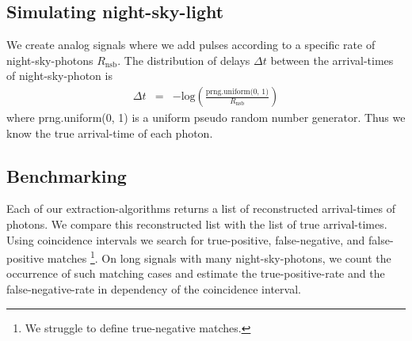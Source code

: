 \documentclass{article}%
\begin{document}
\begin{multicols}{2}
\subsection*{Simulating night-sky-light}%
%
We create analog signals where we add pulses according to a specific rate of night-sky-photons $R_\text{nsb}$.
%
The distribution of delays $\Delta t$ between the arrival-times of night-sky-photon is
%
\begin{eqnarray}
\Delta t &=& - \mathrm{log}\left( \frac{\text{prng.uniform(0, 1)}}{R_\text{nsb}}\right)
\end{eqnarray}
%
where prng.uniform(0, 1) is a uniform pseudo random number generator.
%
Thus we know the true arrival-time of each photon.
%
\subsection*{Benchmarking}%
%
Each of our extraction-algorithms returns a list of reconstructed arrival-times of photons.
%
We compare this reconstructed list with the list of true arrival-times.
%
Using coincidence intervals we search for true-positive, false-negative, and false-positive matches \footnote{We struggle to define true-negative matches.}.
%
On long signals with many night-sky-photons, we count the occurrence of such matching cases and estimate the true-positive-rate and the false-negative-rate in dependency of the coincidence interval.
%

\end{multicols}
\end{document}
